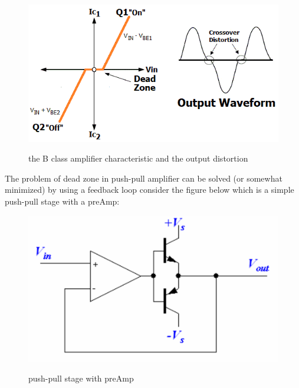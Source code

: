 \documentclass[11pt]{article}
\begin{document}
\begin{figure}[H]
    \begin{center}
        \includegraphics[scale=0.6]{Fig/deadZone.png}
        \label{fig:deadzone}
        \caption{the B class amplifier characteristic and the output distortion}
    \end{center}
\end{figure}

The problem of dead zone in push-pull amplifier can be solved (or somewhat minimized) by using
a feedback loop consider the figure below which is a simple push-pull stage with a preAmp: \\
\begin{figure}[H]
    \begin{center}
        \includegraphics[scale=0.5]{Fig/preAmp.png}
        \label{fig:preAmp}
        \caption{push-pull stage with preAmp}
    \end{center}
\end{figure}
\end{document}
